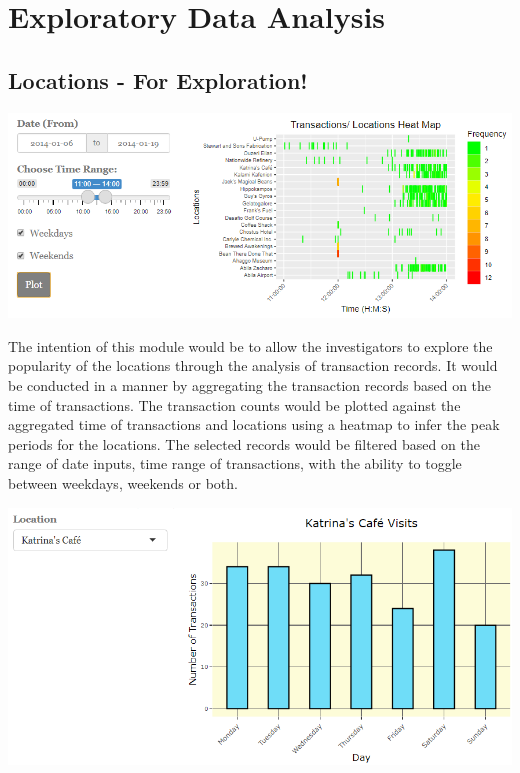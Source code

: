 \documentclass{acm_proc_article-sp}
\begin{document}
\hypertarget{exploratory-data-analysis}{%
\section{Exploratory Data Analysis}\label{exploratory-data-analysis}}

\hypertarget{locations---for-exploration}{%
\subsection{Locations - For
Exploration!}\label{locations---for-exploration}}

\includegraphics{img/Locations.PNG}

The intention of this module would be to allow the investigators to
explore the popularity of the locations through the analysis of
transaction records. It would be conducted in a manner by aggregating
the transaction records based on the time of transactions. The
transaction counts would be plotted against the aggregated time of
transactions and locations using a heatmap to infer the peak periods for
the locations. The selected records would be filtered based on the range
of date inputs, time range of transactions, with the ability to toggle
between weekdays, weekends or both.

\includegraphics{img/Locations2.PNG}
\end{document}
